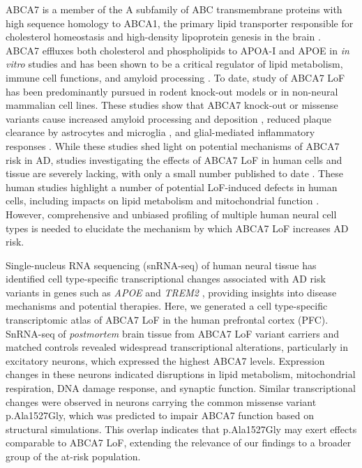 \documentclass[12pt]{article}
\begin{document}
ABCA7 is a member of the A subfamily of ABC transmembrane proteins \cite{Kim2008-zi} with high sequence homology to ABCA1, the primary lipid transporter responsible for cholesterol homeostasis and high-density lipoprotein genesis in the brain \cite{Koldamova2014-kd}. ABCA7 effluxes both cholesterol and phospholipids to APOA-I and APOE in \textit{in vitro} studies \cite{Abe-Dohmae2004-wb,Wang2003-wh,Tomioka2017-nv,Picataggi2022-yp,Quazi2013-pe,Fang2025} and has been shown to be a critical regulator of lipid metabolism, immune cell functions, and amyloid processing \cite{Aikawa2018-ek,Tanaka2011-zo,Duchateau2023-ji,Kawatani2023-vf,Tayran2024-bo}. To date, study of ABCA7 LoF has been predominantly pursued in rodent knock-out models or in non-neural mammalian cell lines. These studies show that ABCA7 knock-out or missense variants  cause increased amyloid processing and deposition \cite{Satoh2015-yu,Sakae2016-uy,Chan2008-qu,Bamji-Mirza2018-xt}, reduced plaque clearance by astrocytes and microglia \cite{Kim2013-sv,Fu2016-qe}, and glial-mediated inflammatory responses \cite{Aikawa2019-hv,Aikawa2021-vz}.  While these studies shed light on potential mechanisms of ABCA7 risk in AD, studies investigating the effects of ABCA7 LoF in human cells and tissue are severely lacking, with only a small number published to date \cite{Kawatani2023-vf,Allen2017-vw,Liu2021-zh,Bamji-Mirza2018-xt}.  These human studies highlight a number of potential LoF-induced defects in human cells, including impacts on lipid metabolism and mitochondrial function \cite{Kawatani2023-vf}. However, comprehensive and unbiased profiling of multiple human neural cell types is needed to elucidate the mechanism by which ABCA7 LoF increases AD risk.

Single-nucleus RNA sequencing (snRNA-seq) of human neural tissue has identified cell type-specific transcriptional changes associated with AD risk variants in genes such as \textit{APOE} and \textit{TREM2} \cite{Brase2023-xk,Blanchard2022-cf,Sayed2021-qn,Wamsley2024-zm,Kamath2022-if}, providing insights into disease mechanisms and potential therapies. Here, we generated a cell type-specific transcriptomic atlas of ABCA7 LoF in the human prefrontal cortex (PFC). SnRNA-seq of \textit{postmortem} brain tissue from ABCA7 LoF variant carriers and matched controls revealed widespread transcriptional alterations, particularly in excitatory neurons, which expressed the highest ABCA7 levels. Expression changes in these neurons indicated disruptions in lipid metabolism, mitochondrial respiration, DNA damage response, and synaptic function. Similar transcriptional changes were observed in neurons carrying the common missense variant p.Ala1527Gly, which was predicted to impair ABCA7 function based on structural simulations. This overlap indicates that p.Ala1527Gly may exert effects comparable to ABCA7 LoF, extending the relevance of our findings to a broader group of the at-risk population.
\end{document}
